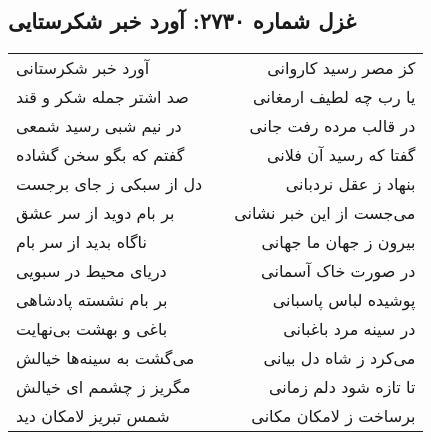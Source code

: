 \begin{center}
\section*{غزل شماره ۲۷۳۰: آورد خبر شکرستایی}
\label{sec:2730}
\begin{longtable}{l p{0.5cm} r}
آورد خبر شکرستانی
&&
کز مصر رسید کاروانی
\\
صد اشتر جمله شکر و قند
&&
یا رب چه لطیف ارمغانی
\\
در نیم شبی رسید شمعی
&&
در قالب مرده رفت جانی
\\
گفتم که بگو سخن گشاده
&&
گفتا که رسید آن فلانی
\\
دل از سبکی ز جای برجست
&&
بنهاد ز عقل نردبانی
\\
بر بام دوید از سر عشق
&&
می‌جست از این خبر نشانی
\\
ناگاه بدید از سر بام
&&
بیرون ز جهان ما جهانی
\\
دریای محیط در سبویی
&&
در صورت خاک آسمانی
\\
بر بام نشسته پادشاهی
&&
پوشیده لباس پاسبانی
\\
باغی و بهشت بی‌نهایت
&&
در سینه مرد باغبانی
\\
می‌گشت به سینه‌ها خیالش
&&
می‌کرد ز شاه دل بیانی
\\
مگریز ز چشمم ای خیالش
&&
تا تازه شود دلم زمانی
\\
شمس تبریز لامکان دید
&&
برساخت ز لامکان مکانی
\\
\end{longtable}
\end{center}
